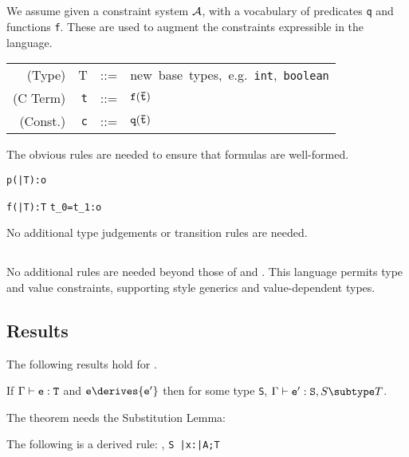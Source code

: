 \subsection{\FXD}
We assume given a constraint system $\cal A$, with a vocabulary of
predicates {\tt q} and functions {\tt f}. These are used to 
augment the constraints expressible in the language. 

\begin{tabular}{r@{\quad}rcl}
  (Type) & T & {::=}& \mbox{new base types, e.g. {\tt int}, {\tt boolean}}\\
  (C Term) & {\tt t} &{::=}& $\tt f(\bar{\tt t})$ \\
  (Const.) & {\tt c} &{::=}& ${\tt q(\bar{\tt t})}$ 
\end{tabular}

The obvious rules are needed to ensure that formulas are well-formed.
{\footnotesize
{}
	{\Gamma \vdash \tt p(\bar{\tt T}):o}

	{\tt\Gamma \vdash \tt f(\bar{\tt T}):T}
	{\tt\Gamma \vdash t_0=t_1:o}
}
No additional type judgements or transition rules are needed. 

\subsection{\FXGD} 

No additional rules are needed beyond those of \FXG{} and \FXD{}. This
language permits type and value constraints, supporting \FGJ{} style
generics and value-dependent types.


\subsection{Results}
The following results hold for \FXGD.

\begin{theorem} If $\Gamma \vdash {\tt e:T}$ and ${\tt e} \derives {\tt e'}$ then for some type {\tt S}, $\Gamma \vdash {\tt e':S},{S \subtype T}$.
\end{theorem}

The theorem needs the Substitution Lemma:
\begin{lemma} The following is a derived rule:
{\Gamma {}, {\tt S \subtype \bar{\tt x}:\bar{\tt A};T}}
\end{lemma}

